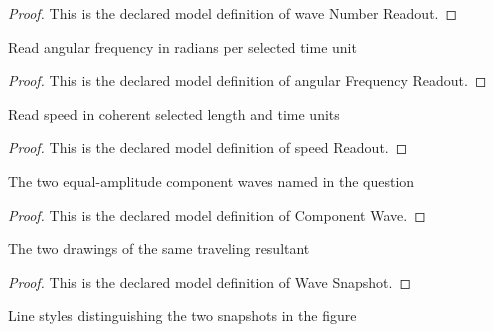 \begin{proof}
  This is the declared model definition of wave Number Readout.
\end{proof}
\begin{definition}
  \label{def:physics:phyx-mini-0294:phyxminiproblems-problemphyxmini0294-angularfrequencyreadout}
  Read angular frequency in radians per selected time unit
\end{definition}
\begin{proof}
  This is the declared model definition of angular Frequency Readout.
\end{proof}
\begin{definition}
  \label{def:physics:phyx-mini-0294:phyxminiproblems-problemphyxmini0294-speedreadout}
  Read speed in coherent selected length and time units
\end{definition}
\begin{proof}
  This is the declared model definition of speed Readout.
\end{proof}
\begin{definition}
  \label{def:physics:phyx-mini-0294:phyxminiproblems-problemphyxmini0294-componentwave}
  The two equal-amplitude component waves named in the question
\end{definition}
\begin{proof}
  This is the declared model definition of Component Wave.
\end{proof}
\begin{definition}
  \label{def:physics:phyx-mini-0294:phyxminiproblems-problemphyxmini0294-wavesnapshot}
  The two drawings of the same traveling resultant
\end{definition}
\begin{proof}
  This is the declared model definition of Wave Snapshot.
\end{proof}
\begin{definition}
  \label{def:physics:phyx-mini-0294:phyxminiproblems-problemphyxmini0294-curvestyle}
  Line styles distinguishing the two snapshots in the figure
\end{definition}
